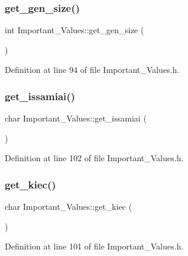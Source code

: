 \subsubsection{\texorpdfstring{get\_gen\_size()}{get\_gen\_size()}}
{\footnotesize\ttfamily int Important\+\_\+\+Values\+::get\+\_\+gen\+\_\+size (\begin{DoxyParamCaption}{ }\end{DoxyParamCaption})\hspace{0.3cm}{\ttfamily [inline]}}



Definition at line 94 of file Important\+\_\+\+Values.\+h.

\mbox{\label{class_important___values_a8089c172511e40d7d45a8692c6ce4f6d}} 
\subsubsection{\texorpdfstring{get\_issamiai()}{get\_issamiai()}}
{\footnotesize\ttfamily char Important\+\_\+\+Values\+::get\+\_\+issamiai (\begin{DoxyParamCaption}{ }\end{DoxyParamCaption})\hspace{0.3cm}{\ttfamily [inline]}}



Definition at line 102 of file Important\+\_\+\+Values.\+h.

\mbox{\label{class_important___values_a484f0bb9caa78d044f3f491629045649}} 
\subsubsection{\texorpdfstring{get\_kiec()}{get\_kiec()}}
{\footnotesize\ttfamily char Important\+\_\+\+Values\+::get\+\_\+kiec (\begin{DoxyParamCaption}{ }\end{DoxyParamCaption})\hspace{0.3cm}{\ttfamily [inline]}}



Definition at line 101 of file Important\+\_\+\+Values.\+h.

